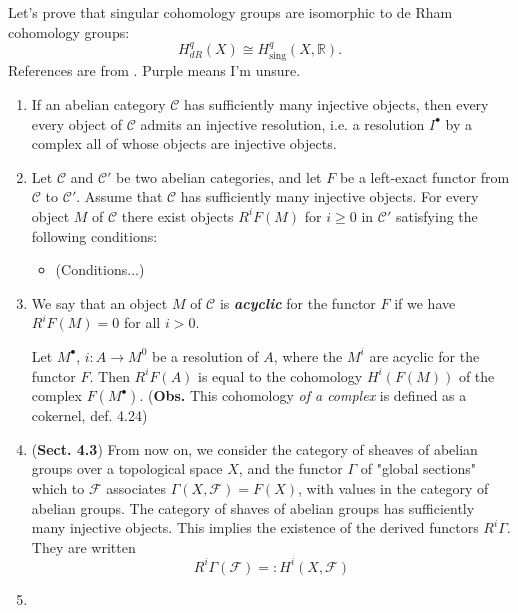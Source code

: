 \documentclass{article}
\numberwithin{equation}{section}
\newcommand{\R}{\mathbb{R}}
\newcommand{\Cc}{\mathcal{C}}
\newcommand{\Fc}{\mathcal{F}}
\DeclareMathOperator{\sing}{sing}
\begin{document}
	Let's prove that singular cohomology groups are isomorphic to de Rham cohomology groups:
	\[H_{dR}^q(X)\cong H^q_{\sing}(X,\R).\]
	References are from \cite{voisin}. {\color{blue-violet}Purple} means I'm unsure.
	
	
	\begin{enumerate}
		\item \begin{lemma}[4.26]
			If an abelian category $\Cc$ has sufficiently many injective objects, then every every object of $\Cc$ admits an injective resolution, i.e. a resolution $I^\bullet$ by a complex all of whose objects are injective objects.
		\end{lemma}
		\item 	\begin{thm}
			Let $\Cc$ and $\Cc'$ be two abelian categories, and let $F$ be a left-exact functor from $\Cc$ to $\Cc'$. Assume that $\Cc$ has sufficiently many injective objects. For every object $M$ of $\Cc$ there exist objects $R^iF(M)$ for $i\geq0$ in $\Cc'$ satisfying the following conditions:
			\begin{itemize}
				\item (Conditions...)
			\end{itemize}
		\end{thm}
		\item \begin{defn}[4.31]
			We say that an object $M$ of $\Cc$ is \textbf{\textit{acyclic}} for the functor $F$ if we have $R^iF(M)=0$ for all $i>0$.
		\end{defn}
		\begin{prop}[4.32]
			Let $M^\bullet$, $i:A\to M^0$ be a resolution of $A$, where the $M^i$ are acyclic for the functor $F$. Then $R^iF(A)$ is equal to the cohomology $H^i(F(M))$ of the complex $F(M^\bullet)$. (\textbf{Obs.} This  cohomology \textit{of a complex} is defined as a cokernel, def. 4.24)
		\end{prop}
		\item (\textbf{Sect. 4.3}) From now on, we consider the category of sheaves of abelian groups over a topological space $X$, and the functor $\Gamma$ of "global sections" which to $\Fc$ associates $\Gamma(X,\Fc)=F(X)$, with values in the category of abelian groups. The category of shaves of abelian groups has sufficiently many injective objects. This implies the existence of the derived functors $R^i\Gamma$. They are written
		\[R^i\Gamma(\Fc)=:H^i(X,\Fc)\]
		\item \begin{defn}[4.33]

\end{defn}
\end{enumerate}
\end{document}
